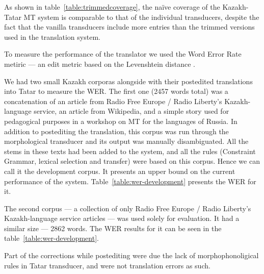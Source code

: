 \documentclass[11pt]{article}
\begin{document}
As shown in table~\ref{table:trimmedcoverage}, the naïve coverage of the Kazakh-Tatar MT system is comparable to that of the individual transducers, despite the fact that the vanilla transducers include more entries than the trimmed versions used in the translation system.

To measure the performance of the translator we used the Word Error Rate metiric --- an edit metric based on the
Levenshtein distance \citep{levenshtein/1966}.

We had two small Kazakh corporas alongside with their postedited translations into Tatar to measure the WER.
The first one (2457 words total) was a concatenation of an article from Radio Free Europe / Radio Liberty's
Kazakh-language service, an article from Wikipedia, and a simple story used for pedagogical purposes in a workshop
on MT for the languages of Russia. In addition to postediting the translation, this corpus was run through the
morphological transducer and its output was manually disambiguated. All the stems in these texts had been added to
the system, and all the rules (Constraint Grammar, lexical selection and transfer) were based on this corpus.
Hence we can call it the development corpus. It presents an upper bound on the current performance
of the system. Table~\ref{table:wer-development} presents the WER for it. %

The second corpus --- a collection of only Radio Free Europe / Radio Liberty's
Kazakh-language service articles --- was used solely for evaluation. It had a similar size --- 2862 words.
The WER results for it can be seen in the table~\ref{table:wer-development}. %

Part of the corrections while postediting were due the lack of morphophonoligical rules in Tatar transducer,
and were not translation errors as such.


\end{document}
